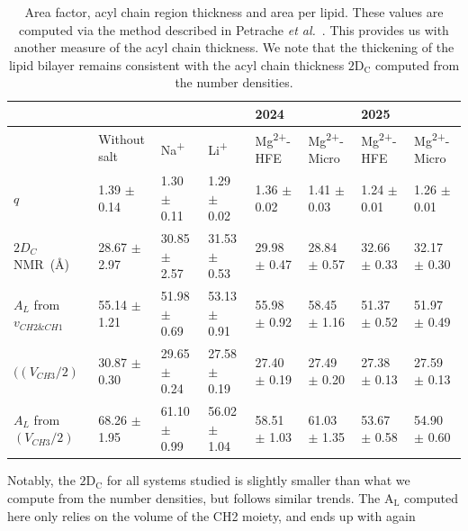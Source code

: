 \documentclass[12pt,openany,final]{book}
\newcommand{\etal}{\textit{et al.}}
\newcommand{\dc}{$\text{2D}_\text{C}$}
\newcommand{\al}{$\text{A}_{\text{L}}$}
\newcommand{\na}{Na\textsuperscript{+}}
\newcommand{\li}{Li\textsuperscript{+}}
\newcommand{\mg}{Mg\textsuperscript{2+}}
\begin{document}
\begin{table}[H]
{\tiny
    \caption[Structural Parameters from Acyl-Chain Ordering]{Area factor, acyl chain region thickness and area per lipid. These values are computed via the method described in Petrache \etal~\cite{petrache:2000:nmrarea}. This provides us with another
    measure of the acyl chain thickness. We note that the thickening of the lipid bilayer remains consistent with the acyl chain thickness \dc{} computed from the number densities.}
    \label{tab:opstruc}
    \begin{tabularx}{\textwidth}{X|X|X|X|X|X|X|X}
    \multicolumn{4}{l}{ }                       & \multicolumn{2}{l}{2024} & \multicolumn{2}{l}{2025}\\\hline
                                                & Without salt             & \na                              & \li                & \mg-HFE            & \mg-Micro          & \mg-HFE            & \mg-Micro \\\hline
    $q$                                         & 1.39 $\pm$ 0.14          & 1.30 $\pm$ 0.11                  & 1.29 $\pm$ 0.02    & 1.36 $\pm$ 0.02    & 1.41 $\pm$ 0.03    & 1.24 $\pm$ 0.01    & 1.26 $\pm$ 0.01 \\\hline
    $2D_C$ NMR~(\AA)                            & 28.67 $\pm$ 2.97         & 30.85 $\pm$ 2.57                 & 31.53 $\pm$ 0.53   & 29.98 $\pm$ 0.47   & 28.84 $\pm$ 0.57   & 32.66 $\pm$ 0.33   & 32.17 $\pm$ 0.30\\\hline
    $A_L$ from $v_{CH2\&CH1}$                   & 55.14 $\pm$ 1.21         & 51.98 $\pm$ 0.69                 & 53.13 $\pm$ 0.91   & 55.98 $\pm$ 0.92   & 58.45 $\pm$ 1.16   & 51.37 $\pm$ 0.52   & 51.97 $\pm$ 0.49 \\\hline
    $((V_{CH3}/2)$                              & 30.87 $\pm$ 0.30         & 29.65 $\pm$ 0.24                 & 27.58 $\pm$ 0.19   & 27.40 $\pm$ 0.19   & 27.49 $\pm$ 0.20   & 27.38 $\pm$ 0.13   & 27.59 $\pm$ 0.13 \\\hline
    $A_L$ from  $(V_{CH3}/2)$                   & 68.26 $\pm$ 1.95         & 61.10 $\pm$ 0.99                 & 56.02 $\pm$ 1.04   & 58.51 $\pm$ 1.03   & 61.03 $\pm$ 1.35   & 53.67 $\pm$ 0.58   & 54.90 $\pm$ 0.60 \\\hline
    \end{tabularx}
}
\end{table}
Notably, the \dc{} for all systems studied is slightly smaller than what we compute from the number densities, but follows similar trends.
The \al{} computed here only relies on the volume of the CH2 moiety, and ends up with again
\end{document}

